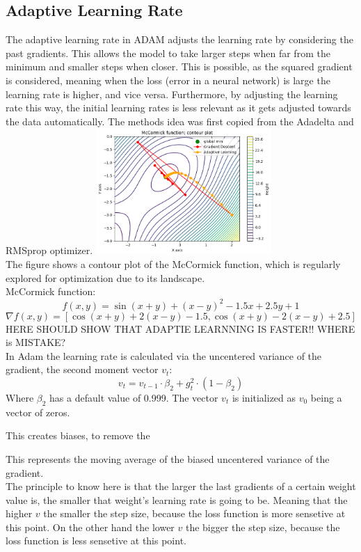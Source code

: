 \documentclass[journal]{IEEEtran}
\begin{document}
\subsection{Adaptive Learning Rate}
The adaptive learning rate in ADAM adjusts the learning rate by considering the past gradients. This allows the model to take larger steps when far from the minimum and smaller steps when closer. This is possible, as the squared gradient is considered, meaning when the loss (error in a neural network) is large the learning rate is higher, and vice versa. Furthermore, by adjusting the learning rate this way, the initial learning rates is less relevant as it gets adjusted towards the data automatically. The methods idea was first copied from the Adadelta and RMSprop optimizer.
\includegraphics[width=0.5\textwidth]{report/figures/GD_rmsprop.png}\\
The figure shows a contour plot of the McCormick function, which is regularly explored for optimization due to its landscape. \\
McCormick function:
$$ f(x, y) = \sin(x + y) + (x - y)^2 - 1.5x + 2.5y + 1 $$
$$\nabla f(x, y) = [\cos(x + y) + 2(x - y) - 1.5, \cos(x + y) - 2(x - y) + 2.5 ]$$
HERE SHOULD SHOW THAT ADAPTIE LEARNNING IS FASTER!! WHERE is MISTAKE?\\

In Adam the learning rate is calculated via the uncentered variance of the gradient, the second moment vector $v_t$:
$$v_t = v_{t-1} \cdot \beta_2 + g_t^2 \cdot (1-\beta_2)$$
Where $\beta_2$ has a default value of 0.999. The vector $v_t$ is initialized as $v_0$ being a vector of zeros. 

This creates biases, to remove the 

This represents the moving average of the biased uncentered variance of the gradient.\\
The principle to know here is that the larger the last gradients of a certain weight value is, the smaller that weight's learning rate is going to be. Meaning that the higher $v$ the smaller the step size, because the loss function is more sensetive at this point. On the other hand the lower $v$ the bigger the step size, because the loss function is less sensetive at this point.\\
\end{document}
